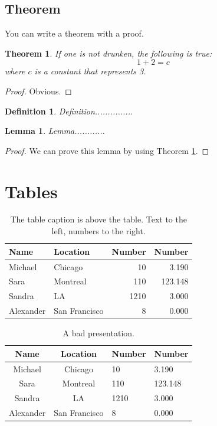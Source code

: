 \documentclass[letterpaper, 11pt]{article}
\newtheorem{theorem}{Theorem}
\newtheorem{lemma}{Lemma}
\newtheorem{definition}{Definition}
\begin{document}
\subsection{Theorem}

You can write a theorem with a proof.

\begin{theorem} \label{thm:fundamental}
If one is not drunken, the following is true:
\begin{equation}
	1 + 2 = c
\end{equation}
where $c$ is a constant that represents 3.
\end{theorem}
\begin{proof}
Obvious.
\end{proof}

\begin{definition}
Definition...............
\end{definition}

\begin{lemma}
Lemma............
\end{lemma}
\begin{proof}
We can prove this lemma by using Theorem \ref{thm:fundamental}.
\end{proof}












\section{Tables}


\begin{table} \centering
\caption{The table caption is above the table. Text to the left, numbers to the right. }
\label{tbl:example}
\begin{tabular}{l l r r}
\toprule
Name		& Location		&  Number	& Number \\
\midrule
Michael		& Chicago			&      10   &   3.190  \\
Sara		& Montreal			&     110   & 123.148  \\
Sandra		& LA				&    1210   &   3.000  \\
Alexander	& San Francisco		&       8   &   0.000  \\
\bottomrule
\end{tabular}
\end{table}

\begin{table} \centering
\caption{A bad presentation.}
\label{tbl:bad_example}
\begin{tabular}{c c l l}
\toprule
Name		& Location		&  Number	& Number \\
\midrule
Michael		& Chicago			&      10   &   3.190  \\
Sara		& Montreal			&     110   & 123.148  \\
Sandra		& LA				&    1210   &   3.000  \\
Alexander	& San Francisco		&       8   &   0.000  \\
\bottomrule
\end{tabular}
\end{table}
\end{document}
